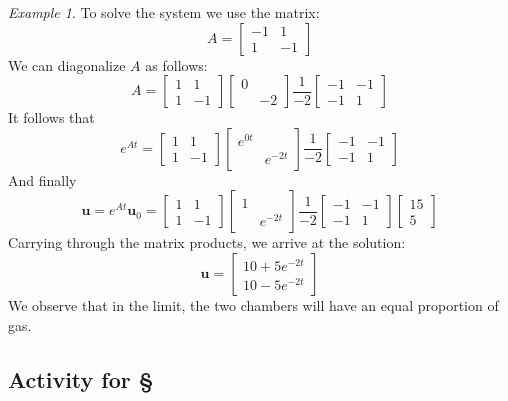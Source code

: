 \documentclass[11pt,oneside]{amsbook}
\theoremstyle{definition}
\theoremstyle{plain}
\theoremstyle{definition}
\theoremstyle{remark}
\newtheorem{example}[theorem]{Example}
\numberwithin{equation}{section}
\numberwithin{figure}{section}
\begin{document}
\begin{example}
  To solve the system we use the matrix:
  \[A=\begin{bmatrix}-1&1\\1&-1\end{bmatrix}
  \]
  We can diagonalize $A$ as follows:
  \[A=\begin{bmatrix}1&1\\1&-1\end{bmatrix}
      \begin{bmatrix}0\\&-2\end{bmatrix}
      \frac{1}{-2}
      \begin{bmatrix}-1&-1\\-1&1\end{bmatrix}
  \]
  It follows that
  \[e^{At}=\begin{bmatrix}1&1\\1&-1\end{bmatrix}
    \begin{bmatrix}e^{0t}\\&e^{-2t}\end{bmatrix}
    \frac{1}{-2}
    \begin{bmatrix}-1&-1\\-1&1\end{bmatrix}
  \]
  And finally
  \[\mathbf{u}=e^{At}\mathbf{u}_0
    =\begin{bmatrix}1&1\\1&-1\end{bmatrix}
    \begin{bmatrix}1\\&e^{-2t}\end{bmatrix}
    \frac{1}{-2}
    \begin{bmatrix}-1&-1\\-1&1\end{bmatrix}
    \begin{bmatrix}15\\5\end{bmatrix}
  \]
  Carrying through the matrix products, we arrive at the solution:
  \[\mathbf{u}
    =\begin{bmatrix}10+5e^{-2t}\\10-5e^{-2t}\end{bmatrix}
  \]
  We observe that in the limit, the two chambers will have an equal proportion of gas.
\end{example}

\newpage
\subsection*{Activity for \S \thesection}
\end{document}
